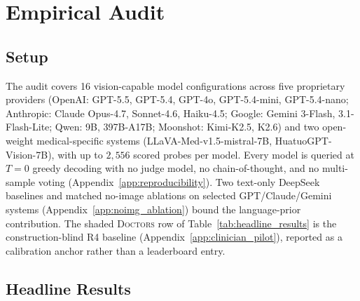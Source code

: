 \documentclass{article}
\begin{document}
\section{Empirical Audit}
\label{sec:experiments}

\subsection{Setup}

The audit covers 16 vision-capable model configurations across five proprietary providers (OpenAI: GPT-5.5, GPT-5.4, GPT-4o, GPT-5.4-mini, GPT-5.4-nano; Anthropic: Claude Opus-4.7, Sonnet-4.6, Haiku-4.5; Google: Gemini 3-Flash, 3.1-Flash-Lite; Qwen: 9B, 397B-A17B; Moonshot: Kimi-K2.5, K2.6) and two open-weight medical-specific systems (LLaVA-Med-v1.5-mistral-7B, HuatuoGPT-Vision-7B), with up to $2{,}556$ scored probes per model. Every model is queried at $T{=}0$ greedy decoding with no judge model, no chain-of-thought, and no multi-sample voting (Appendix~\ref{app:reproducibility}). Two text-only DeepSeek baselines and matched no-image ablations on selected GPT/Claude/Gemini systems (Appendix~\ref{app:noimg_ablation}) bound the language-prior contribution. The shaded \textsc{Doctors} row of Table~\ref{tab:headline_results} is the construction-blind \textsc{R4} baseline (Appendix~\ref{app:clinician_pilot}), reported as a calibration anchor rather than a leaderboard entry.

\subsection{Headline Results}
\end{document}
